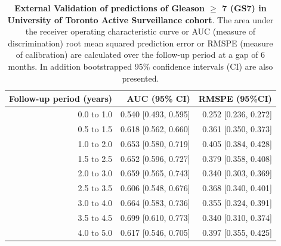 \begin{table}[!htb]
\small\sf\centering
\caption{\textbf{External Validation of predictions of Gleason $\geq$ 7 (GS7) in University of Toronto Active Surveillance cohort}. The area under the receiver operating characteristic curve or AUC (measure of discrimination) root mean squared prediction error or RMSPE (measure of calibration) are calculated over the follow-up period at a gap of 6 months. In addition bootstrapped 95\% confidence intervals (CI) are also presented.}
\label{tab:AUC_PE_Toronto}
\begin{tabular}{r|r|r}
\hline
\hline
Follow-up period (years) & AUC (95\% CI) & RMSPE (95\%CI)\\ 
\hline
0.0 to 1.0 & 0.540 [0.493, 0.595] & 0.252 [0.236, 0.272]\\
0.5 to 1.5 & 0.618 [0.562, 0.660] & 0.361 [0.350, 0.373]\\
1.0 to 2.0 & 0.653 [0.580, 0.719] & 0.405 [0.384, 0.428]\\
1.5 to 2.5 & 0.652 [0.596, 0.727] & 0.379 [0.358, 0.408]\\
2.0 to 3.0 & 0.659 [0.565, 0.743] & 0.340 [0.303, 0.369]\\
2.5 to 3.5 & 0.606 [0.548, 0.676] & 0.368 [0.340, 0.401]\\
3.0 to 4.0 & 0.664 [0.583, 0.736] & 0.355 [0.324, 0.391]\\
3.5 to 4.5 & 0.699 [0.610, 0.773] & 0.340 [0.310, 0.374]\\
4.0 to 5.0 & 0.617 [0.546, 0.705] & 0.397 [0.355, 0.425]\\
\hline
\end{tabular}	
\end{table}

